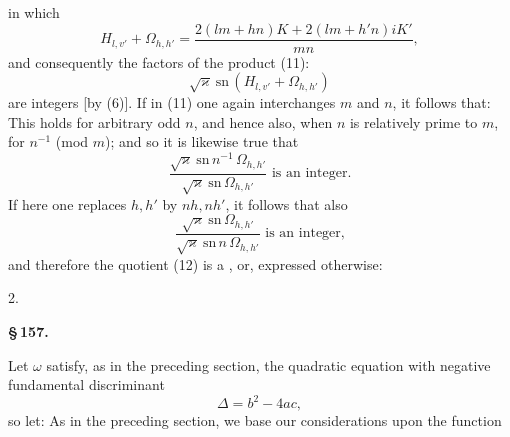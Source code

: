 
in which
\[
H_{l,v'} + \Omega_{h,h'} = \dfrac{2(lm+hn)K + 2(lm+h'n)iK'}{mn}, %
\]
and consequently the factors of the product (11):
\[
\sqrt{\varkappa}\ \mathrm{sn}\,(H_{l,v'} + \Omega_{h,h'})
\]
are integers [by (6)]. If in (11) one again interchanges $m$ and $n$, it follows that:
This holds for arbitrary odd $n$, and hence also, when $n$ is relatively prime to $m$, for $n^{-1}$ (mod $m$); and so it is likewise true that
\[
\dfrac{\sqrt{\varkappa}\ \mathrm{sn}\,n^{-1}\,\Omega_{h,h'}}{\sqrt{\varkappa}\ \mathrm{sn}\,\Omega_{h,h'}} \text{ is an integer.}
\]
If here one replaces $h,h'$ by $nh, nh'$, it follows that also
\[
\dfrac{\sqrt{\varkappa}\ \mathrm{sn}\,\Omega_{h,h'}}{\sqrt{\varkappa}\ \mathrm{sn}\,n\,\Omega_{h,h'}} \text{ is an integer,}
\]
and therefore the quotient (12) is a , or, expressed otherwise:

2. 

\begin{center}
\textbf{\S\,157.\qquad {}}
\end{center}

Let $\omega$ satisfy, as in the preceding section, the quadratic equation
with negative fundamental discriminant
\[
\varDelta = b^2 - 4ac,
\]
so let:
As in the preceding section, we base our considerations upon the function
